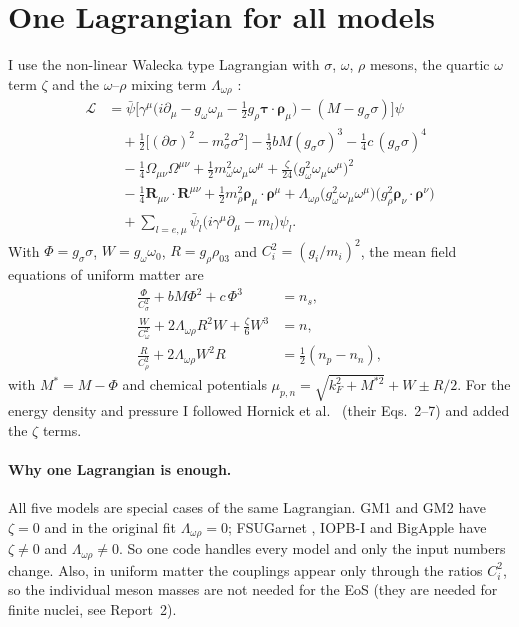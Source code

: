 \documentclass[11pt,a4paper]{article}
\begin{document}
\section{One Lagrangian for all models}\label{sec:lagrangian}
I use the non-linear Walecka type Lagrangian \cite{Walecka1974,BogutaBodmer1977,SerotWalecka1986} with $\sigma$, $\omega$, $\rho$ mesons, the quartic $\omega$ term $\zeta$ \cite{MullerSerot1996} and the $\omega$--$\rho$ mixing term $\Lambda_{\omega\rho}$ \cite{HorowitzPiekarewicz2001,ToddRutel2005}:
\begin{align}
\mathcal{L} &= \bar\psi\Big[\gamma^\mu\big(i\partial_\mu - g_\omega\omega_\mu - \tfrac12 g_\rho\boldsymbol{\tau}\cdot\boldsymbol{\rho}_\mu\big) - (M - g_\sigma\sigma)\Big]\psi \nonumber\\
&\quad + \tfrac12\big[(\partial\sigma)^2 - m_\sigma^2\sigma^2\big] - \tfrac13 b M (g_\sigma\sigma)^3 - \tfrac14 c\,(g_\sigma\sigma)^4 \nonumber\\
&\quad - \tfrac14\Omega_{\mu\nu}\Omega^{\mu\nu} + \tfrac12 m_\omega^2\omega_\mu\omega^\mu + \tfrac{\zeta}{24}\big(g_\omega^2\omega_\mu\omega^\mu\big)^2 \nonumber\\
&\quad - \tfrac14\mathbf{R}_{\mu\nu}\cdot\mathbf{R}^{\mu\nu} + \tfrac12 m_\rho^2\boldsymbol{\rho}_\mu\cdot\boldsymbol{\rho}^\mu + \Lambda_{\omega\rho}\big(g_\omega^2\omega_\mu\omega^\mu\big)\big(g_\rho^2\boldsymbol{\rho}_\nu\cdot\boldsymbol{\rho}^\nu\big) \nonumber\\
&\quad + \sum_{l=e,\mu}\bar\psi_l\big(i\gamma^\mu\partial_\mu - m_l\big)\psi_l .
\end{align}
With $\Phi=g_\sigma\sigma$, $W=g_\omega\omega_0$, $R=g_\rho\rho_{03}$ and $C_i^2=(g_i/m_i)^2$, the mean field equations of uniform matter are
\begin{align}
\frac{\Phi}{C_\sigma^2} + bM\Phi^2 + c\,\Phi^3 &= n_s,\\
\frac{W}{C_\omega^2} + 2\Lambda_{\omega\rho}R^2W + \frac{\zeta}{6}W^3 &= n,\\
\frac{R}{C_\rho^2} + 2\Lambda_{\omega\rho}W^2 R &= \tfrac12(n_p-n_n),
\end{align}
with $M^*=M-\Phi$ and chemical potentials $\mu_{p,n}=\sqrt{k_F^2+M^{*2}}+W\pm R/2$. For the energy density and pressure I followed Hornick et al.\ \cite{Hornick2018} (their Eqs.~2--7) and added the $\zeta$ terms.

\paragraph{Why one Lagrangian is enough.} All five models are special cases of the same Lagrangian. GM1 and GM2 \cite{GM1991} have $\zeta=0$ and in the original fit $\Lambda_{\omega\rho}=0$; FSUGarnet \cite{FSUGarnet}, IOPB-I \cite{IOPBI} and BigApple \cite{BigApple} have $\zeta\neq0$ and $\Lambda_{\omega\rho}\neq0$. So one code handles every model and only the input numbers change. Also, in uniform matter the couplings appear only through the ratios $C_i^2$, so the individual meson masses are not needed for the EoS (they are needed for finite nuclei, see Report~2).
\end{document}
